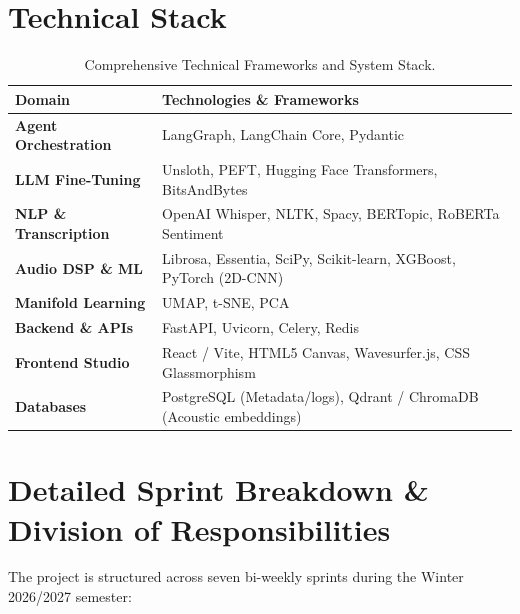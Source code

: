 \documentclass[11pt,a4paper]{article}
\begin{document}
\section{Technical Stack}

\begin{table}[htbp]
\centering
\small
\renewcommand{\arraystretch}{1.25}
\begin{tabularx}{\textwidth}{p{4.0cm} X}
\toprule
\rowcolor{tableheader}
\textbf{Domain} & \textbf{Technologies \& Frameworks} \\
\midrule
\textbf{Agent Orchestration} & LangGraph, LangChain Core, Pydantic \\
\textbf{LLM Fine-Tuning} & Unsloth, PEFT, Hugging Face Transformers, BitsAndBytes \\
\textbf{NLP \& Transcription} & OpenAI Whisper, NLTK, Spacy, BERTopic, RoBERTa Sentiment \\
\textbf{Audio DSP \& ML} & Librosa, Essentia, SciPy, Scikit-learn, XGBoost, PyTorch (2D-CNN) \\
\textbf{Manifold Learning} & UMAP, t-SNE, PCA \\
\textbf{Backend \& APIs} & FastAPI, Uvicorn, Celery, Redis \\
\textbf{Frontend Studio} & React / Vite, HTML5 Canvas, Wavesurfer.js, CSS Glassmorphism \\
\textbf{Databases} & PostgreSQL (Metadata/logs), Qdrant / ChromaDB (Acoustic embeddings) \\
\bottomrule
\end{tabularx}
\caption{Comprehensive Technical Frameworks and System Stack.}
\label{tab:techstack}
\end{table}

\section{Detailed Sprint Breakdown \& Division of Responsibilities}

The project is structured across seven bi-weekly sprints during the Winter 2026/2027 semester:
\end{document}
